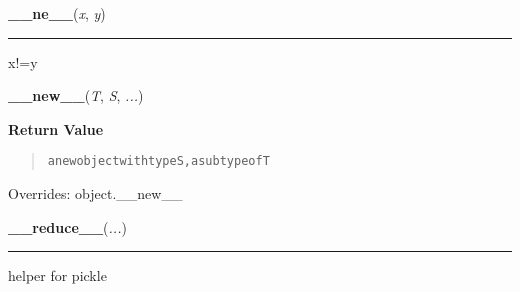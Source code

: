     \label{list:__ne__}

    \vspace{0.5ex}

    \begin{boxedminipage}{\textwidth}

    \raggedright \textbf{\_\_ne\_\_}(\textit{x}, \textit{y})

    \vspace{-1.5ex}

    \rule{\textwidth}{0.5\fboxrule}

x!=y
    \vspace{1ex}

    \end{boxedminipage}

    \vspace{0.5ex}

    \begin{boxedminipage}{\textwidth}

    \raggedright \textbf{\_\_new\_\_}(\textit{T}, \textit{S}, \textit{...})

      \textbf{Return Value}
      \begin{quote}
\begin{alltt}
a new object with type S, a subtype of T
\end{alltt}

      \end{quote}

    \vspace{1ex}

      Overrides: object.\_\_new\_\_

    \end{boxedminipage}

    \label{object:__reduce__}

    \vspace{0.5ex}

    \begin{boxedminipage}{\textwidth}

    \raggedright \textbf{\_\_reduce\_\_}(\textit{...})

    \vspace{-1.5ex}

    \rule{\textwidth}{0.5\fboxrule}

helper for pickle
    \vspace{1ex}

    \end{boxedminipage}


